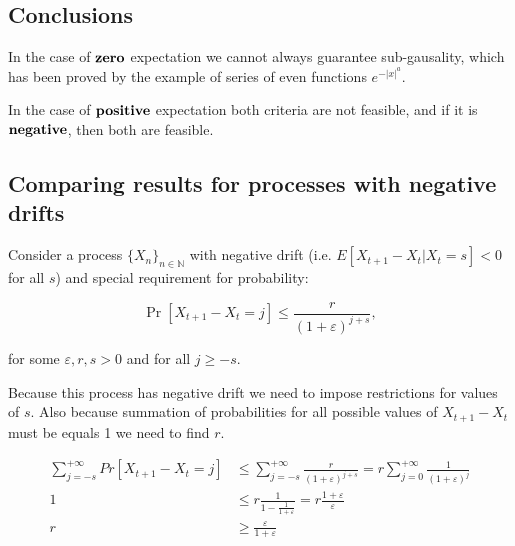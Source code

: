 \documentclass[12pt, a4paper]{article}
\theoremstyle{remark}
\newcommand{\expx}[1]{e^{-|x|^{#1}}}
\begin{document}
\begin{figure}[h!]
\begin{center}
    \end{center}
\end{figure}

\subsection*{Conclusions}

In the case of $\textbf{\text{zero}}$ expectation we cannot always guarantee sub-gausality, which has been proved by the example of series of even functions $\expx{a}$.

In the case of $\textbf{\text{positive}}$ expectation both criteria are not feasible, and if it is $\textbf{\text{negative}}$, then both are feasible.

\subsection{Comparing results for processes with negative drifts}

Consider a process \( \{ X_n \}_{n \in \mathbb{N}}\) with negative drift (i.e. \(E[X_{t + 1} - X_{t} | X_t = s] < 0\) for all \(s\)) and special requirement for probability:

\[
    \Pr[X_{t + 1} - X_{t} = j] \leq \frac{r}{(1 + \varepsilon)^{j + s}},
\]

for some \(\varepsilon, r, s > 0\) and for all \(j \geq -s\).

Because this process has negative drift we need to impose restrictions for values of \(s\). Also because summation of probabilities for all possible values of \(X_{t + 1} - X_{t}\) must be equals 1 we need to find \(r\).

\begin{align*}
    \sum_{j = -s}^{+\infty} Pr[X_{t + 1} - X_t = j] &\leq \sum_{j = -s}^{+\infty} \frac{r}{(1 + \varepsilon)^{j + s}} = r \sum_{j = 0}^{+\infty} \frac{1}{(1 + \varepsilon)^{j}} \\
    1 &\leq r \frac{1}{1 - \frac{1}{1 + \varepsilon}} = r \frac{1 + \varepsilon}{\varepsilon} \\
    r &\geq \frac{\varepsilon}{1 + \varepsilon} 
\end{align*}
\end{document}
